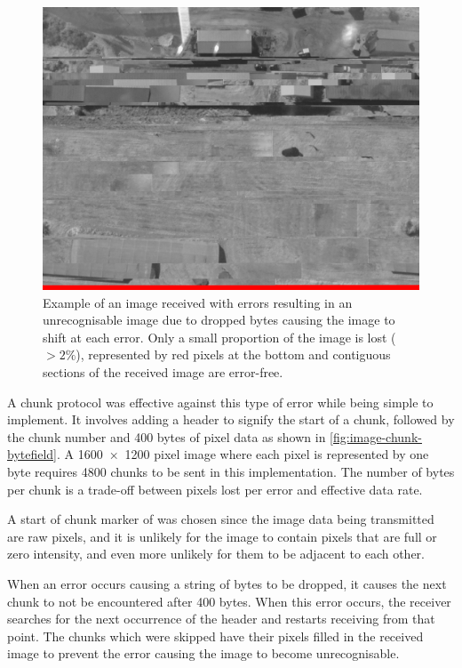 \documentclass{report}
\begin{document}
\begin{figure}[H]
  \centering
  \includegraphics[width=\linewidth]{images/results/sheds_naive.png}
  \caption{Example of an image received with errors resulting in an unrecognisable image due to dropped bytes causing the image to shift at each error. Only a small proportion of the image is lost ($>2\%$), represented by red pixels at the bottom and contiguous sections of the received image are error-free.}
  \label{fig:image-sheds-error-demo}
\end{figure}

A chunk protocol was effective against this type of error while being simple to implement. It involves adding a header to signify the start of a chunk, followed by the chunk number and 400 bytes of pixel data as shown in \ref{fig:image-chunk-bytefield}. A \SI{1600x1200}{} pixel image where each pixel is represented by one byte requires 4800 chunks to be sent in this implementation. The number of bytes per chunk is a trade-off between pixels lost per error and effective data rate.

A start of chunk marker of \texttt{} was chosen since the image data being transmitted are raw pixels, and it is unlikely for the image to contain pixels that are full or zero intensity, and even more unlikely for them to be adjacent to each other.

When an error occurs causing a string of bytes to be dropped, it causes the next chunk to not be encountered after 400 bytes. When this error occurs, the receiver searches for the next occurrence of the header and restarts receiving from that point. The chunks which were skipped have their pixels filled in the received image to prevent the error causing the image to become unrecognisable.
\end{document}
